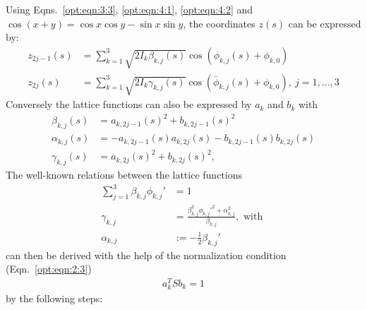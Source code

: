 Using Eqns.~\ref{opt:eqn:3:3}, \ref{opt:eqn:4:1}, \ref{opt:eqn:4:2} and $\cos(x+y)=\cos x\cos y-\sin x\sin y$, the coordinates $z(s)$ can be expressed by:
\begin{align}
z_{2j-1}(s)&=\sum_{k=1}^3 \sqrt{2I_k
\beta_{k,j}(s)}\cos{(\phi_{k,j}(s)+\phi_{k,0})}\\
z_{2j}(s)&=\sum_{k=1}^3 \sqrt{2I_k
\gamma_{k,j}(s)}\cos{(\bar\phi_{k,j}(s)+\phi_{k,0})}, \ j=1,\ldots,3
\end{align}
Conversely the lattice functions can also be expressed by $a_k$ and $b_k$ with
\begin{align}
\beta_{k,j}(s)&=a_{k,2j-1}(s)^2 +b_{k,2j-1}(s)^2 \\
\alpha_{k,j}(s)&=- a_{k,2j-1}(s)a_{k,2j}(s) -b_{k,2j-1}(s)b_{k,2j}(s) \\
\gamma_{k,j}(s)&=a_{k,2j}(s)^2 +b_{k,2j}(s)^2,
\end{align}
The well-known relations between the lattice functions
\begin{align}
\sum_{j=1}^3\beta_{k,j}\phi_{k,j}'&=1 \\
\gamma_{k,j}&=\frac{\beta_{k,j}^2\phi_{k,j}'^2+\alpha_{k,j}^2}{\beta_{k,j}}, \text{ with  }\\
\alpha_{k,j}&:=-\frac{1}{2}\beta_{k,j}'
\end{align}
can then be derived with the help of the normalization condition (Eqn.~\ref{opt:eqn:2:3})
\begin{align}
a_k^TSb_k=1
\end{align}
by the following steps:
